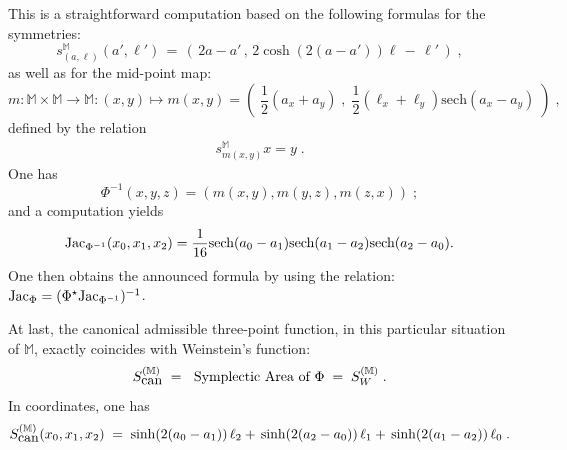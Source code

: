 \documentclass{article}
\newcommand{\MM}{\mathbb M}
\newcommand{\sech}{\mbox{sech}}
\begin{document}
This is a straightforward computation based on the following formulas for the symmetries:
\begin{equation}\label{symPpl}
s^{\MM}_{(a,\ell)}(a',\ell')\,=\,(\,2a-a'\,,\,2\cosh(2(a-a'))\ell\,-\,\ell'\,)\;,
\end{equation}
as well as for the mid-point map:
\begin{equation}\label{midPpl}
m: \MM\times  \MM\to  \MM:(x,y)\mapsto m(x,y)=\left(\;\frac{1}{2}(a_x+a_y)\;,\;\frac{1}{2}(\ell_x+\ell_y)\sech(a_x-a_y)\;\right)\;,
\end{equation}
defined by the relation
\begin{eqnarray*}
s^{\MM}_{m(x,y)}x=y\;.
\end{eqnarray*}
One has 
\begin{equation*}
\Phi^{-1}(x,y,z)=(m(x,y),m(y,z),m(z,x))\;;
\end{equation*}
and a computation yields
\begin{equation*}
\mbox{\rm Jac}_{\Phi^{-1}}(x_0,x_1,x_2)=\frac{1}{16}\sech(a_0-a_1)\sech(a_1-a_2)\sech(a_2-a_0).
\end{equation*}
One then obtains the announced formula by using the relation: 
$\mbox{\rm Jac}_{\Phi}=(\Phi^\star\mbox{\rm Jac}_{\Phi^{-1}})^{-1}$.

\noindent At last, the canonical admissible three-point function, in this particular situation of $\MM$, exactly coincides
with Weinstein's function:
\begin{equation*}
S^{( \MM)}_{\mbox{\rm can}}\;=\;\mbox{ \rm Symplectic Area of } \Phi\;=\;S^{( \MM)}_W\;.
\end{equation*}
In coordinates, one has 
\begin{equation*}
S^{( \MM)}_{\mbox{\rm can}}(x_0,x_1,x_2)\;=\;\sinh(2(a_0-a_1))\,\ell_2+\,\sinh(2(a_2-a_0))\,\ell_1+\,\sinh(2(a_1-a_2))\,\ell_0\;.
\end{equation*}

\vspace{3mm}
\end{document}
